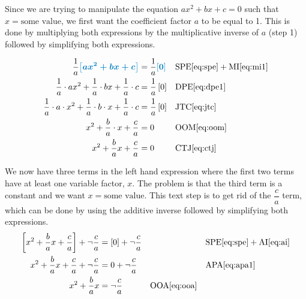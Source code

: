 Since we are trying to manipulate the equation  $ax^2+bx+c=0$ such that $x=\text{some value}$, we first want the coefficient factor $a$ to be equal to 1.  This is done by multiplying both expressions by the multiplicative inverse of $a$ (step 1) followed by simplifying both expressions.


\begin{align*}
\dfrac{1}{a} \farg{ax^2 + bx +c} & = \dfrac{1}{a} \farg{0} && \text{SPE} \eqref{eq:spe} + \text{MI} \eqref{eq:mi1} \\
\dfrac{1}{a} \cdot ax^2 + \dfrac{1}{a} \cdot bx + \dfrac{1}{a} \cdot c  & = \dfrac{1}{a} \left[ 0\right] && \text{DPE} \eqref{eq:dpe1} \\
\dfrac{1}{a} \cdot a \cdot x^2 + \dfrac{1}{a} \cdot b \cdot x + \dfrac{1}{a} \cdot c  & = \dfrac{1}{a} \left[ 0\right] && \text{JTC} \eqref{eq:jtc} \\
x^2 + \dfrac{b}{a} \cdot x + \dfrac{c}{a} & = 0 && \text{OOM} \eqref{eq:oom} \\
x^2 +\dfrac{b}{a}x + \dfrac{c}{a}  & = 0 && \text{CTJ} \eqref{eq:ctj} 
\end{align*}

We now have three terms in the left hand expression where the first two terms have at least one variable factor, $x$.  The problem is that the third term is a constant and we want $x=\text{some value}$.  This text step is to get rid of the $\dfrac{c}{a}$ term, which can be done by using the additive inverse followed by simplifying both expressions.\\

\begin{align*}
\left[x^2 +\dfrac{b}{a}x + \dfrac{c}{a} \right]  + \neg \dfrac{c}{a}  & = \left[ 0 \right]   + \neg \dfrac{c}{a} && && \text{SPE} \eqref{eq:spe} + \text{AI} \eqref{eq:ai} \\
x^2 +\dfrac{b}{a}x + \dfrac{c}{a} + \neg \dfrac{c}{a}  & = 0  + \neg \dfrac{c}{a} && && \text{APA} \eqref{eq:apa1} \\
x^2 +\dfrac{b}{a}x  & = \neg \dfrac{c}{a} && \text{OOA} \eqref{eq:ooa} \\
\end{align*}



